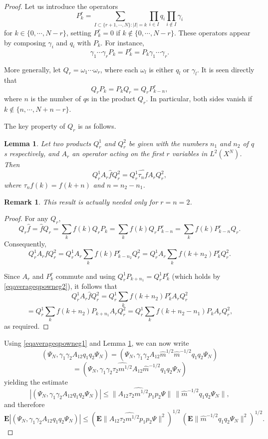 \documentclass[12pt]{article}
\def\E{\mathbf{E}}
\def\ga{\gamma}
\newtheorem{lemma}{Lemma}[section]
\newtheorem{remark}{Remark}
\newcommand{\om}{\omega}
\begin{document}
\begin{proof}
Let us introduce the operators
\[
P_k^r=\sum_{I\subset \{r+1, \cdots , N\}: |I|=k} \prod_{i\in I} q_i \prod_{i\notin I} \ga_i
\]
for $k\in \{0, \cdots, N-r\}$,
setting $P_k^r=0$ if $k\notin \{0, \cdots, N-r\}$.
These operators appear by composing $\ga_i$ and $q_i$ with $P_k$. For instance,
\[
\ga_1 \cdots \ga_r P_k =P_k^r=P_k \ga_1 \cdots \ga_r.
\]

More generally, let $Q_r=\om_1 \cdots \om_r$, where each $\om_l$ is either $q_l$ or $\ga_l$.
It is seen directly that
\begin{equation}
\label{eqaverageqpowneg2}
Q_r P_k=P_kQ_r=Q_r P^r_{k-n},
\end{equation}
where $n$ is the number of $q$s in the product $Q_r$.
In particular, both sides vanish if $k\notin \{n, \cdots ,N+n-r\}$.

The key property of $Q_r$ is as follows.

\begin{lemma}
\label{knowlpilemma}
Let two products $Q_r^1$ and $Q_r^2$ be given with the numbers $n_1$
and $n_2$ of $q$s respectively, and $A_r$ an operator acting on the first $r$ variables in $L^2(X^N)$.
Then
\[
Q_r^1 A_r \hat f Q_r^2 =Q_r^1 \widehat{\tau_nf}  A_r Q_r^2,
\]
where $\tau_n f(k) =f(k+n)$ and $n=n_2-n_1$.
\end{lemma}

\begin{remark} This result is actually needed only for $r=n=2$.
\end{remark}

\begin{proof}
For any $Q_r$,
\[
Q_r \hat f=\hat f Q_r=\sum_k f(k) Q_r P_k=\sum_k f(k) Q_r P^r_{k-n}
=\sum_k f(k) P^r_{k-n} Q_r.
\]
Consequently,
\[
Q_r^1 A_r \hat f Q_r^2 =Q_r^1 A_r \sum_k f(k) P^r_{k-n_2} Q_r^2=Q_r^1 A_r \sum_k f(k+n_2) P^r_k Q_r^2.
\]

Since $A_r$ and $P_k^r$ commute
and using $Q_r^1 P_{k+n_1}=Q_r^1 P^r_k$ (which holds by \eqref{eqaverageqpowneg2}),
it follows that
\[
Q_r^1 A_r \hat f Q_r^2
 =Q_r^1 \sum_k f(k+n_2) P^r_k A_r Q_r^2
 \]
 \[
 =Q_r^1 \sum_k f(k+n_2) P_{k+n_1} A_r Q_r^2
=Q_r^1 \sum_k f(k+n_2-n_1) P_k A_r Q_r^2,
\]
as required.
\end{proof}

Using \eqref{eqaverageqpowneg1} and Lemma \ref{knowlpilemma}, we can now write
\[
(\Psi_N, \ga_1\ga_2A_{12} q_1 q_2\Psi_N)
=(\Psi_N, \ga_1\ga_2A_{12}  \hat m^{1/2} \hat m^{-1/2} q_1 q_2\Psi_N)
\]
\[
=(\Psi_N, \ga_1\ga_2   \widehat{\tau_2m^{1/2}} A_{12} \hat m^{-1/2} q_1 q_2\Psi_N)
\]
yielding the estimate
\begin{equation}
\label{eqPicklthirdterm}
|(\Psi_N, \ga_1\ga_2A_{12} q_1 q_2\Psi_N)|
\le \|A_{12}  \widehat{\tau_2m^{1/2}} p_1p_2 \Psi\| \, \| \hat m^{-1/2} q_1q_2\Psi_N\|,
\end{equation}
and therefore
\begin{equation}
\label{eqPicklthirdterm1}
\E |(\Psi_N, \ga_1\ga_2A_{12} q_1 q_2\Psi_N)|
\le \left(\E \|A_{12}  \widehat{\tau_2m^{1/2}} p_1p_2 \Psi\|^2\right)^{1/2}
 \, \left( \E\| \hat m^{-1/2} q_1q_2\Psi_N\|^2\right)^{1/2}.
\end{equation}


\end{proof}
\end{document}
